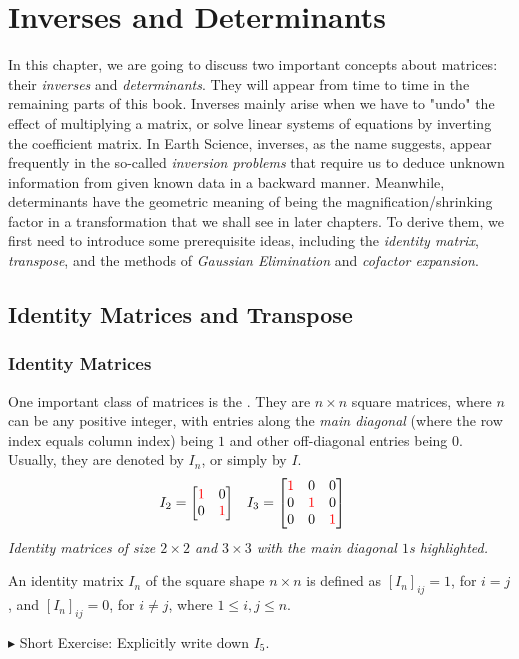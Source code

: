 \chapter{Inverses and Determinants}
\label{chapter:invdet}

In this chapter, we are going to discuss two important concepts about matrices: their \textit{inverses} and \textit{determinants}. They will appear from time to time in the remaining parts of this book. Inverses mainly arise when we have to "undo" the effect of multiplying a matrix, or solve linear systems of equations by inverting the coefficient matrix. In Earth Science, inverses, as the name suggests, appear frequently in the so-called \textit{inversion problems} that require us to deduce unknown information from given known data in a backward manner. Meanwhile, determinants have the geometric meaning of being the magnification/shrinking factor in a transformation that we shall see in later chapters. To derive them, we first need to introduce some prerequisite ideas, including the \textit{identity matrix}, \textit{transpose}, and the methods of \textit{Gaussian Elimination} and \textit{cofactor expansion}.

\section{Identity Matrices and Transpose}

\subsection{Identity Matrices}
One important class of matrices is the . They are $n \times n$ square matrices, where $n$ can be any positive integer, with entries along the \textit{main diagonal} (where the row index equals column index) being $1$ and other off-diagonal entries being $0$. Usually, they are denoted by $I_n$, or simply by $I$.
{\begin{align*}
I_2 &= 
\begin{bmatrix}
\mathcolor{red}{1} & 0 \\
0 & \mathcolor{red}{1}
\end{bmatrix}
& I_3 &= 
\begin{bmatrix}
\mathcolor{red}{1} & 0 & 0 \\
0 & \mathcolor{red}{1} & 0 \\
0 & 0 & \mathcolor{red}{1}
\end{bmatrix}
\end{align*}
\textit{Identity matrices of size $2 \times 2$ and $3 \times 3$ with the main diagonal $1$s highlighted.}}
\begin{defn}
\label{defn:identity}
An identity matrix $I_n$ of the square shape $n \times n$ is defined as $[I_{n}]_{ij} = 1$, for $i = j$, and $[I_{n}]_{ij} = 0$, for $i \neq j$, where $1 \leq i,j \leq n$.
\end{defn}
$\blacktriangleright$ Short Exercise: Explicitly write down $I_5$.\footnotemark

